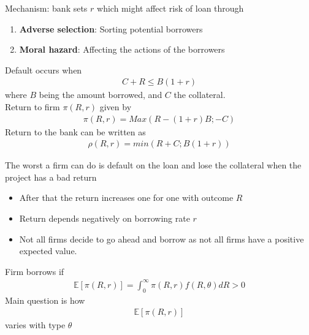 \documentclass{beamer}
\begin{document}
\begin{frame}
 Mechanism: bank sets $r$ which might affect risk of loan through
\begin{enumerate}
  \item \textbf{Adverse selection}: Sorting potential borrowers
  \item \textbf{Moral hazard}: Affecting the actions of the borrowers
\end{enumerate}
\end{frame}

\begin{frame}
 Default occurs when
\begin{align}
  C+R\leq B(1+r)
\end{align}
\medskip
where $B$ being the amount borrowed, and $C$ the collateral.\\
Return to firm $\pi(R,r)$ given by
\begin{align}
  \pi(R,r)=Max(R-(1+r)B;-C)
\end{align}
\medskip
Return to the bank can be written as 
\begin{align}
  \rho(R,r)=min(R+C;B(1+r))
\end{align}
\end{frame}

\begin{frame}
The worst a firm can do is default on the loan and lose the collateral when the project has a bad return
\begin{itemize}
  \item After that the return increases one for one with outcome $R$
  \item Return depends negatively on borrowing rate $r$
  \item Not all firms decide to go ahead and borrow as not all firms have a positive expected value.
\end{itemize}
\end{frame}

\begin{frame}
Firm borrows if
\begin{align}
  \mathbb{E}[\pi(R,r)]=\int_0^{\infty} \pi(R,r)f(R,\theta)dR>0
\end{align}
\medskip
Main question is how 
\begin{align}
  \mathbb{E}[\pi(R,r)]
\end{align}
\medskip
varies with type $\theta$
\end{frame}
\end{document}
